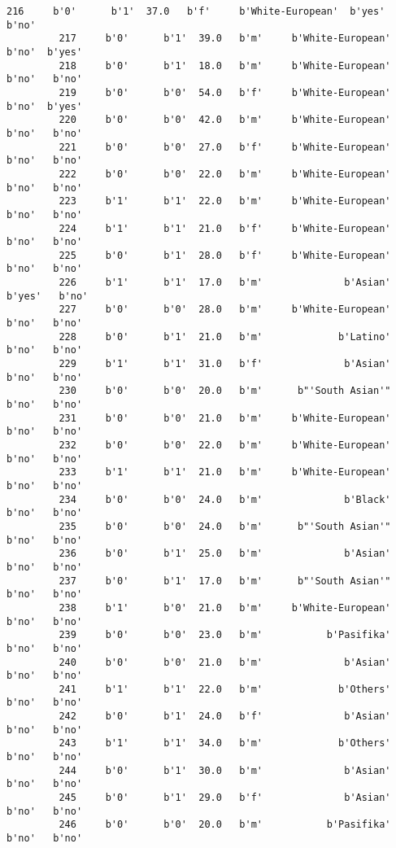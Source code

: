 \documentclass[11pt]{article}
\begin{document}
\begin{Verbatim}[commandchars=\\\{\}]
         216     b'0'      b'1'  37.0   b'f'     b'White-European'  b'yes'   b'no'   
         217     b'0'      b'1'  39.0   b'm'     b'White-European'   b'no'  b'yes'   
         218     b'0'      b'1'  18.0   b'm'     b'White-European'   b'no'   b'no'   
         219     b'0'      b'0'  54.0   b'f'     b'White-European'   b'no'  b'yes'   
         220     b'0'      b'0'  42.0   b'm'     b'White-European'   b'no'   b'no'   
         221     b'0'      b'0'  27.0   b'f'     b'White-European'   b'no'   b'no'   
         222     b'0'      b'0'  22.0   b'm'     b'White-European'   b'no'   b'no'   
         223     b'1'      b'1'  22.0   b'm'     b'White-European'   b'no'   b'no'   
         224     b'1'      b'1'  21.0   b'f'     b'White-European'   b'no'   b'no'   
         225     b'0'      b'1'  28.0   b'f'     b'White-European'   b'no'   b'no'   
         226     b'1'      b'1'  17.0   b'm'              b'Asian'  b'yes'   b'no'   
         227     b'0'      b'0'  28.0   b'm'     b'White-European'   b'no'   b'no'   
         228     b'0'      b'1'  21.0   b'm'             b'Latino'   b'no'   b'no'   
         229     b'1'      b'1'  31.0   b'f'              b'Asian'   b'no'   b'no'   
         230     b'0'      b'0'  20.0   b'm'      b"'South Asian'"   b'no'   b'no'   
         231     b'0'      b'0'  21.0   b'm'     b'White-European'   b'no'   b'no'   
         232     b'0'      b'0'  22.0   b'm'     b'White-European'   b'no'   b'no'   
         233     b'1'      b'1'  21.0   b'm'     b'White-European'   b'no'   b'no'   
         234     b'0'      b'0'  24.0   b'm'              b'Black'   b'no'   b'no'   
         235     b'0'      b'0'  24.0   b'm'      b"'South Asian'"   b'no'   b'no'   
         236     b'0'      b'1'  25.0   b'm'              b'Asian'   b'no'   b'no'   
         237     b'0'      b'1'  17.0   b'm'      b"'South Asian'"   b'no'   b'no'   
         238     b'1'      b'0'  21.0   b'm'     b'White-European'   b'no'   b'no'   
         239     b'0'      b'0'  23.0   b'm'           b'Pasifika'   b'no'   b'no'   
         240     b'0'      b'0'  21.0   b'm'              b'Asian'   b'no'   b'no'   
         241     b'1'      b'1'  22.0   b'm'             b'Others'   b'no'   b'no'   
         242     b'0'      b'1'  24.0   b'f'              b'Asian'   b'no'   b'no'   
         243     b'1'      b'1'  34.0   b'm'             b'Others'   b'no'   b'no'   
         244     b'0'      b'1'  30.0   b'm'              b'Asian'   b'no'   b'no'   
         245     b'0'      b'1'  29.0   b'f'              b'Asian'   b'no'   b'no'   
         246     b'0'      b'0'  20.0   b'm'           b'Pasifika'   b'no'   b'no'   

\end{Verbatim}
\end{document}
